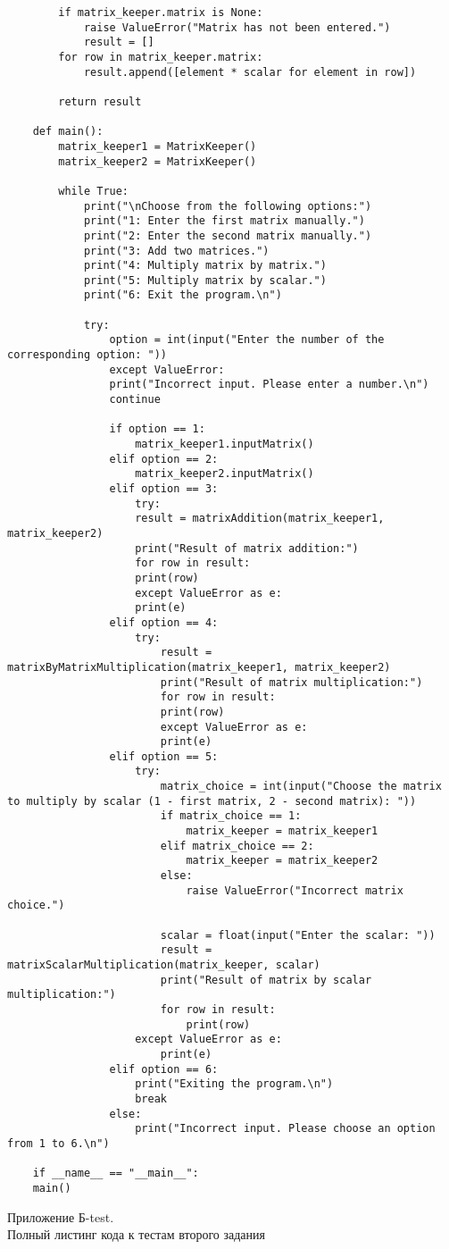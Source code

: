 \begin{lstlisting}
		if matrix_keeper.matrix is None:
			raise ValueError("Matrix has not been entered.")
			result = []
		for row in matrix_keeper.matrix:
			result.append([element * scalar for element in row])
		
		return result
		
	def main():
		matrix_keeper1 = MatrixKeeper()
		matrix_keeper2 = MatrixKeeper()
		
		while True:
			print("\nChoose from the following options:")
			print("1: Enter the first matrix manually.")
			print("2: Enter the second matrix manually.")
			print("3: Add two matrices.")
			print("4: Multiply matrix by matrix.")
			print("5: Multiply matrix by scalar.")
			print("6: Exit the program.\n")
			
			try:
				option = int(input("Enter the number of the corresponding option: "))
				except ValueError:
				print("Incorrect input. Please enter a number.\n")
				continue
				
				if option == 1:
					matrix_keeper1.inputMatrix()
				elif option == 2:
					matrix_keeper2.inputMatrix()
				elif option == 3:
					try:
					result = matrixAddition(matrix_keeper1, matrix_keeper2)
					print("Result of matrix addition:")
					for row in result:
					print(row)
					except ValueError as e:
					print(e)
				elif option == 4:
					try:
						result = matrixByMatrixMultiplication(matrix_keeper1, matrix_keeper2)
						print("Result of matrix multiplication:")
						for row in result:
						print(row)
						except ValueError as e:
						print(e)
				elif option == 5:
					try:
						matrix_choice = int(input("Choose the matrix to multiply by scalar (1 - first matrix, 2 - second matrix): "))
						if matrix_choice == 1:
							matrix_keeper = matrix_keeper1
						elif matrix_choice == 2:
							matrix_keeper = matrix_keeper2
						else:
							raise ValueError("Incorrect matrix choice.")
						
						scalar = float(input("Enter the scalar: "))
						result = matrixScalarMultiplication(matrix_keeper, scalar)
						print("Result of matrix by scalar multiplication:")
						for row in result:
							print(row)
					except ValueError as e:
						print(e)
				elif option == 6:
					print("Exiting the program.\n")
					break
				else:
					print("Incorrect input. Please choose an option from 1 to 6.\n")
	
	if __name__ == "__main__":
	main()
\end{lstlisting}

\centering\begin{large}
	{Приложение Б-test.\\
		Полный листинг кода к тестам второго задания}\\ \\
\end{large}

